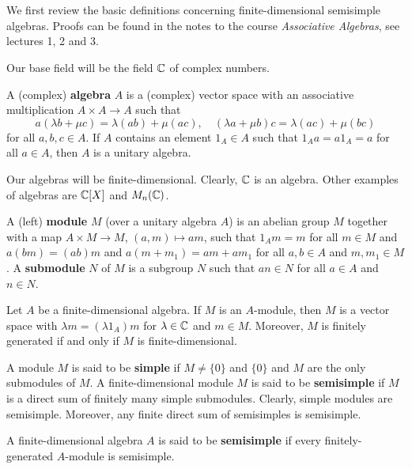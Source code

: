 \chapter{}


We first review the basic definitions concerning
finite-dimensional semisimple algebras. 
Proofs can be found in the
notes to the course \emph{Associative Algebras}, see
lectures 1, 2 and 3. 

Our base field will be the field $\mathbb{C}$ of complex numbers. 

A (complex) \textbf{algebra} $A$ is a (complex) vector space  
with an associative multiplication $A\times A\to A$ such that
\[
a(\lambda b+\mu c)=\lambda(ab)+\mu(ac),
\quad
(\lambda a+\mu b)c=\lambda(ac)+\mu (bc)
\]
for all $a,b,c\in A$. If $A$ contains 
an element $1_A\in A$ such that $1_Aa=a1_A=a$ for all $a\in A$, then $A$ is 
a unitary algebra. 

Our algebras will be finite-dimensional. 
Clearly, $\mathbb{C}$ is an algebra. Other 
examples of algebras are $\mathbb{C}[X]$ and $M_n(\mathbb{C})$. 

A (left) \textbf{module} $M$ (over a unitary 
algebra $A$) is an abelian group $M$
together with a map $A\times M\to M$, $(a,m)\mapsto am$, such that
$1_Am=m$ for all $m\in M$ and 
$a(bm)=(ab)m$ and $a(m+m_1)=am+am_1$ for all $a,b\in A$ and $m,m_1\in M$. 
A \textbf{submodule} $N$ of $M$ is a subgroup 
$N$ such that $an\in N$ for all $a\in A$ and $n\in N$. 

\begin{exercise}
Let $A$ be a finite-dimensional algebra. If $M$ 
is an $A$-module, then $M$ is a vector space with 
$\lambda m=(\lambda 1_A)m$ for $\lambda\in\mathbb{C}$ and $m\in M$. Moreover, 
$M$ is finitely generated if and only if $M$ is finite-dimensional. 
\end{exercise}

A module $M$ is said to be \textbf{simple} if $M\ne\{0\}$ and $\{0\}$ and $M$ 
are the only submodules of $M$.	
A finite-dimensional module $M$  
is said to be \textbf{semisimple} if $M$ is a direct sum of 
finitely many simple submodules. 
Clearly, simple modules are semisimple. Moreover, any finite direct sum of semisimples is semisimple. 


A finite-dimensional algebra $A$ is said to be \textbf{semisimple} if
every finitely-generated $A$-module is semisimple. 

